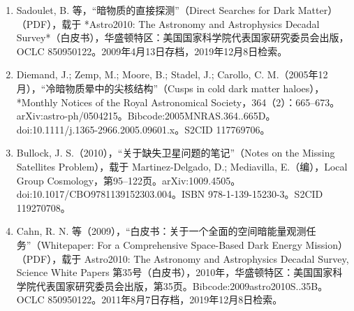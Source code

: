 \begin{enumerate}
\item Sadoulet, B. 等，“暗物质的直接探测”（Direct Searches for Dark Matter）（PDF），载于 *Astro2010: The Astronomy and Astrophysics Decadal Survey*（白皮书），华盛顿特区：美国国家科学院代表国家研究委员会出版，OCLC 850950122。2009年4月13日存档，2019年12月8日检索。  
\item Diemand, J.; Zemp, M.; Moore, B.; Stadel, J.; Carollo, C. M.（2005年12月），“冷暗物质晕中的尖核结构”（Cusps in cold dark matter haloes），*Monthly Notices of the Royal Astronomical Society，364（2）：665–673。arXiv:astro-ph/0504215。Bibcode:2005MNRAS.364..665D。doi:10.1111/j.1365-2966.2005.09601.x。S2CID 117769706。  
\item Bullock, J. S.（2010），“关于缺失卫星问题的笔记”（Notes on the Missing Satellites Problem），载于 Martinez-Delgado, D.; Mediavilla, E.（编），Local Group Cosmology，第95–122页。arXiv:1009.4505。doi:10.1017/CBO9781139152303.004。ISBN 978-1-139-15230-3。S2CID 119270708。  
\item Cahn, R. N. 等（2009），“白皮书：关于一个全面的空间暗能量观测任务”（Whitepaper: For a Comprehensive Space-Based Dark Energy Mission）（PDF），载于 Astro2010: The Astronomy and Astrophysics Decadal Survey, Science White Papers 第35号（白皮书），2010年，华盛顿特区：美国国家科学院代表国家研究委员会出版，第35页。Bibcode:2009astro2010S..35B。OCLC 850950122。2011年8月7日存档，2019年12月8日检索。
\end{enumerate}







